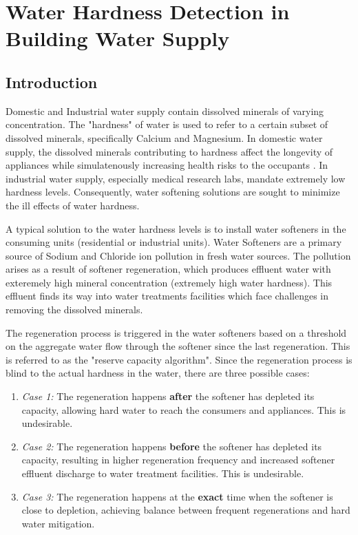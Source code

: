 \chapter{Water Hardness Detection in Building Water Supply}

\section{Introduction}

Domestic and Industrial water supply contain dissolved minerals of varying concentration.
 The "hardness" of water \cite{WhatIsWaterHardness} is used to refer to a certain subset of dissolved minerals, specifically Calcium and Magnesium.
 In domestic water supply, the dissolved minerals contributing to hardness affect the longevity of appliances \cite{SoftenedWaterBenefitsStudy} while simulatenously increasing health risks to the occupants \cite{PotentialHealthImpactsOfHardWater} \cite{WaterHardnessOnCardiovascularDisease}.
 In industrial water supply, especially medical research labs, mandate extremely low hardness levels.
 Consequently, water softening solutions are sought to minimize the ill effects of water hardness.

A typical solution to the water hardness levels is to install water softeners in the consuming units (residential or industrial units).
 Water Softeners are a primary source of Sodium and Chloride ion pollution in fresh water sources.
 The pollution arises as a result of softener regeneration, which produces effluent water with exteremely high mineral concentration (extremely high water hardness).
 This effluent finds its way into water treatments facilities which face challenges in removing the dissolved minerals.

The regeneration process is triggered in the water softeners based on a threshold on the aggregate water flow through the softener since the last regeneration.
 This is referred to as the "reserve capacity algorithm".
 Since the regeneration process is blind to the actual hardness in the water, there are three possible cases:

\begin{enumerate}
\item \emph{Case 1:} The regeneration happens \textbf{after} the softener has depleted its capacity, allowing hard water to reach the consumers and appliances.
 This is undesirable.
\item \emph{Case 2:} The regeneration happens \textbf{before} the softener has depleted its capacity, resulting in higher regeneration frequency and increased softener effluent discharge to water treatment facilities.
 This is undesirable.
\item \emph{Case 3:} The regeneration happens at the \textbf{exact} time when the softener is close to depletion, achieving balance between frequent regenerations and hard water mitigation.
\end{enumerate}

